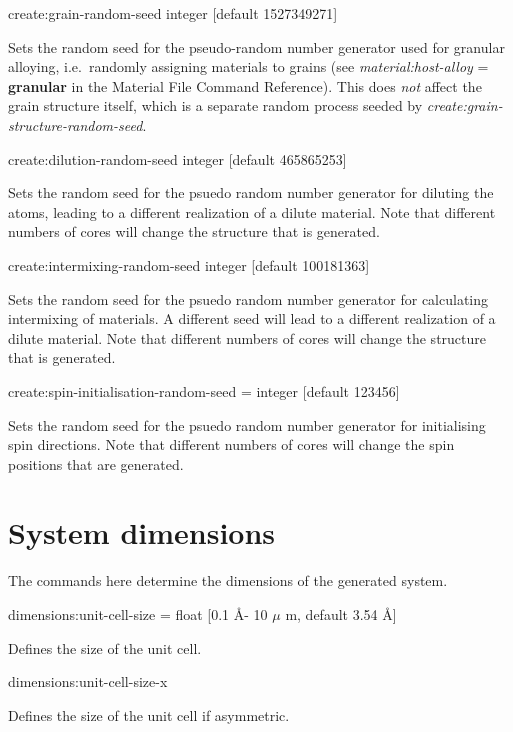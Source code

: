 {\zicf create:grain-random-seed integer [default 1527349271]} Sets the random seed for the pseudo-random number generator used for granular alloying, i.e.\ randomly assigning materials to grains (see \textit{material:host-alloy} = \textbf{granular} in the Material File Command Reference). This does \emph{not} affect the grain structure itself, which is a separate random process seeded by \textit{create:grain-structure-random-seed}.

{\zicf create:dilution-random-seed integer [default 465865253]} Sets the random seed for the psuedo random number generator for diluting the atoms, leading to a different realization of a dilute material. Note that different numbers of cores will change the structure that is generated.

{\zicf create:intermixing-random-seed integer [default 100181363]} Sets the random seed for the psuedo random number generator for calculating intermixing of materials. A different seed will lead to a different realization of a dilute material. Note that different numbers of cores will change the structure that is generated.

{\zicf create:spin-initialisation-random-seed = integer [default 123456]}
Sets the random seed for the psuedo random number generator for initialising
spin directions. Note that different numbers of cores will change the
spin positions that are generated.\\

\section*{System dimensions} The commands here determine the dimensions of the generated system.

{\zicf dimensions:unit-cell-size = float [0.1 \AA - 10 $\mu$ m, default 3.54 \AA]} Defines the size of the unit cell.

{\zicf dimensions:unit-cell-size-x} Defines the size of the unit cell if asymmetric.

